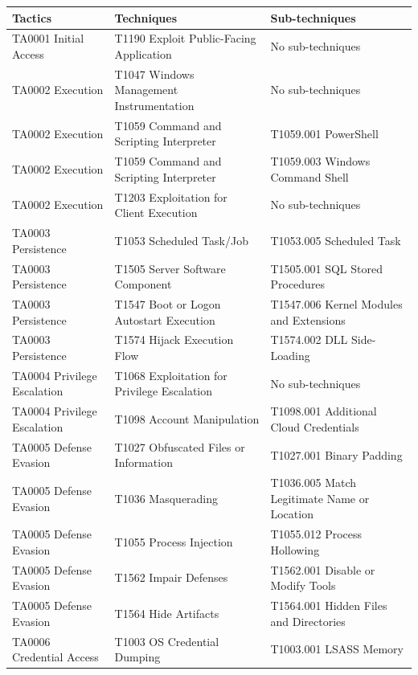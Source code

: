 \begin{center}
\begin{longtable}[H]{|C{0.3\textwidth}|C{0.3\textwidth}|C{0.3\textwidth}|}
\hline \textbf{Tactics} & \textbf{Techniques} & \textbf{Sub-techniques} \\ \hline
TA0001 Initial Access & T1190 Exploit Public-Facing Application & No sub-techniques \\ \hline
TA0002 Execution & T1047 Windows Management Instrumentation & No sub-techniques \\ \hline
TA0002 Execution & T1059 Command and Scripting Interpreter & T1059.001 PowerShell \\ \hline
TA0002 Execution & T1059 Command and Scripting Interpreter & T1059.003 Windows Command Shell \\ \hline
TA0002 Execution & T1203 Exploitation for Client Execution & No sub-techniques \\ \hline
TA0003 Persistence & T1053 Scheduled Task/Job & T1053.005 Scheduled Task \\ \hline
TA0003 Persistence & T1505 Server Software Component & T1505.001 SQL Stored Procedures \\ \hline
TA0003 Persistence & T1547 Boot or Logon Autostart Execution & T1547.006 Kernel Modules and Extensions \\ \hline
TA0003 Persistence & T1574 Hijack Execution Flow & T1574.002 DLL Side-Loading \\ \hline
TA0004 Privilege Escalation & T1068 Exploitation for Privilege Escalation & No sub-techniques \\ \hline
TA0004 Privilege Escalation & T1098 Account Manipulation & T1098.001 Additional Cloud Credentials \\ \hline
TA0005 Defense Evasion & T1027 Obfuscated Files or Information & T1027.001 Binary Padding \\ \hline
TA0005 Defense Evasion & T1036 Masquerading & T1036.005 Match Legitimate Name or Location \\ \hline
TA0005 Defense Evasion & T1055 Process Injection & T1055.012 Process Hollowing \\ \hline
TA0005 Defense Evasion & T1562 Impair Defenses & T1562.001 Disable or Modify Tools \\ \hline
TA0005 Defense Evasion & T1564 Hide Artifacts & T1564.001 Hidden Files and Directories \\ \hline
TA0006 Credential Access & T1003 OS Credential Dumping & T1003.001 LSASS Memory \\ \hline

\end{longtable}
\end{center}
